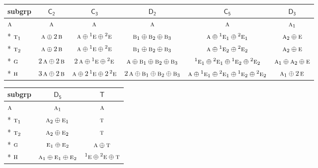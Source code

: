 \documentclass[10pt,a4paper]{article}
\numberwithin{equation}{section}
\newcommand{\grp}[1]{\mathsf{#1}}
\newcommand{\irr}[1]{\text{\normalfont\scshape #1}}
\newcommand{\conjpair}[1]{{}^{#1}}
\begin{document}
{\small\begin{longtable}{@{}lccccc@{}}\toprule
subgrp & \href{C2.pdf}{$\grp{C_{2}}$} & \href{C3.pdf}{$\grp{C_{3}}$} & \href{D2.pdf}{$\grp{D_{2}}$} & \href{C5.pdf}{$\grp{C_{5}}$} & \href{D3.pdf}{$\grp{D_{3}}$}\\\midrule\endhead
\bottomrule\endfoot\endlastfoot
$\irr{a}$ & $\irr{a}$ & $\irr{a}$ & $\irr{a}$ & $\irr{a}$ & $\irr{a}_{1}$\\*
$\irr{t}_{1}$ & $\irr{a}\oplus 2\,\irr{b}$ & $\irr{a}\oplus \conjpair{1}\irr{e}\oplus \conjpair{2}\irr{e}$ & $\irr{b}_{1}\oplus \irr{b}_{2}\oplus \irr{b}_{3}$ & $\irr{a}\oplus \conjpair{1}\irr{e}_{1}\oplus \conjpair{2}\irr{e}_{1}$ & $\irr{a}_{2}\oplus \irr{e}$\\*
$\irr{t}_{2}$ & $\irr{a}\oplus 2\,\irr{b}$ & $\irr{a}\oplus \conjpair{1}\irr{e}\oplus \conjpair{2}\irr{e}$ & $\irr{b}_{1}\oplus \irr{b}_{2}\oplus \irr{b}_{3}$ & $\irr{a}\oplus \conjpair{1}\irr{e}_{2}\oplus \conjpair{2}\irr{e}_{2}$ & $\irr{a}_{2}\oplus \irr{e}$\\*
$\irr{g}$ & $2\,\irr{a}\oplus 2\,\irr{b}$ & $2\,\irr{a}\oplus \conjpair{1}\irr{e}\oplus \conjpair{2}\irr{e}$ & $\irr{a}\oplus \irr{b}_{1}\oplus \irr{b}_{2}\oplus \irr{b}_{3}$ & $\conjpair{1}\irr{e}_{1}\oplus \conjpair{2}\irr{e}_{1}\oplus \conjpair{1}\irr{e}_{2}\oplus \conjpair{2}\irr{e}_{2}$ & $\irr{a}_{1}\oplus \irr{a}_{2}\oplus \irr{e}$\\*
$\irr{h}$ & $3\,\irr{a}\oplus 2\,\irr{b}$ & $\irr{a}\oplus 2\,\conjpair{1}\irr{e}\oplus 2\,\conjpair{2}\irr{e}$ & $2\,\irr{a}\oplus \irr{b}_{1}\oplus \irr{b}_{2}\oplus \irr{b}_{3}$ & $\irr{a}\oplus \conjpair{1}\irr{e}_{1}\oplus \conjpair{2}\irr{e}_{1}\oplus \conjpair{1}\irr{e}_{2}\oplus \conjpair{2}\irr{e}_{2}$ & $\irr{a}_{1}\oplus 2\,\irr{e}$\\
\bottomrule\end{longtable}}
{\small\begin{longtable}{@{}lcc@{}}\toprule
subgrp & \href{D5.pdf}{$\grp{D_{5}}$} & \href{T.pdf}{$\grp{T}$}\\\midrule\endhead
\bottomrule\endfoot\endlastfoot
$\irr{a}$ & $\irr{a}_{1}$ & $\irr{a}$\\*
$\irr{t}_{1}$ & $\irr{a}_{2}\oplus \irr{e}_{1}$ & $\irr{t}$\\*
$\irr{t}_{2}$ & $\irr{a}_{2}\oplus \irr{e}_{2}$ & $\irr{t}$\\*
$\irr{g}$ & $\irr{e}_{1}\oplus \irr{e}_{2}$ & $\irr{a}\oplus \irr{t}$\\*
$\irr{h}$ & $\irr{a}_{1}\oplus \irr{e}_{1}\oplus \irr{e}_{2}$ & $\conjpair{1}\irr{e}\oplus \conjpair{2}\irr{e}\oplus \irr{t}$\\
\bottomrule\end{longtable}}
\end{document}
